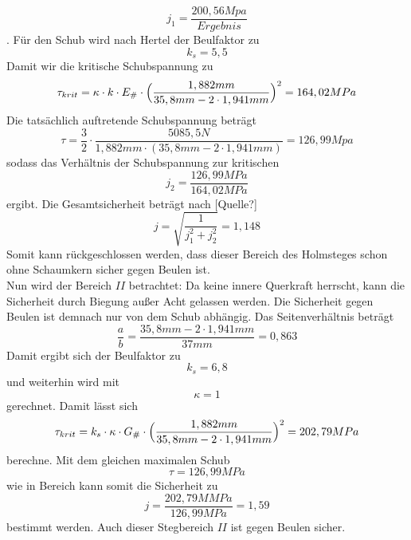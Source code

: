 \begin{equation}
	j_{1}=\frac{200,56 Mpa}{Ergebnis}
\end{equation}. Für den Schub wird nach Hertel der Beulfaktor zu
\begin{equation}
	k_{s}=5,5
\end{equation}
Damit wir die kritische Schubspannung zu 
\begin{equation}
	\tau_{krit}=\kappa\cdot k\cdot E_{\#}\cdot\Bigl(\frac{1,88 2mm}{35,8 mm - 2\cdot 1,941  mm}\Bigr)^{2}=164,02 MPa
\end{equation}
Die tatsächlich auftretende Schubspannung beträgt 
\begin{equation}
	\tau=\frac{3}{2}\cdot \frac{5085,5 N}{1,882 mm\cdot(35,8 mm-2\cdot 1,941 mm)}=126,99 Mpa
\end{equation}
sodass das Verhältnis der Schubspannung zur kritischen 
\begin{equation}
	j_{2}=\frac{126,99 MPa}{164,02 MPa}
\end{equation}
ergibt. Die Gesamtsicherheit beträgt nach [Quelle?]
\begin{equation}
	j=\sqrt{\frac{1}{j_{1}^{2}+j_{2}^{2}}}=1,148
\end{equation}
Somit kann rückgeschlossen werden, dass dieser Bereich des Holmsteges schon ohne Schaumkern sicher gegen Beulen ist.\\

\noindent Nun wird der Bereich $II$ betrachtet:
Da keine innere Querkraft herrscht, kann die Sicherheit durch Biegung außer Acht gelassen werden. Die Sicherheit gegen Beulen ist demnach nur von dem Schub abhängig.
Das Seitenverhältnis beträgt 
\begin{equation}
	\frac{a}{b}=\frac{35,8mm - 2\cdot 1,941mm}{37mm}=0,863
\end{equation}
Damit ergibt sich der Beulfaktor zu 
\begin{equation}
	k_{s}=6,8
\end{equation}
und weiterhin wird mit 
\begin{equation}
	\kappa = 1 
\end{equation}
gerechnet. Damit lässt sich 
\begin{equation}
	 \tau_{krit} = k_{s}\cdot \kappa\cdot G_{\#}\cdot \Bigl(\frac{1,882mm}{35,8mm-2\cdot 1,941mm}\Bigr)^{2}= 202,79 MPa
\end{equation}
berechne. Mit dem gleichen maximalen Schub
\begin{equation}
	\tau=126,99 MPa
\end{equation}
 wie in Bereich kann somit die Sicherheit zu 
 \begin{equation}
 	j=\frac{202,79M MPa}{126,99 MPa}=1,59
 \end{equation}
bestimmt werden. Auch dieser Stegbereich $II$ ist gegen Beulen sicher.\\

